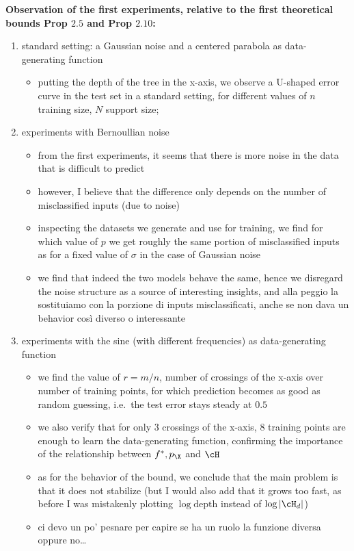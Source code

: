 {\bf Observation of the first experiments, relative to the first theoretical bounds Prop $2.5$ and Prop $2.10$:}

\begin{enumerate}
    \item standard setting: a Gaussian noise and a centered parabola as data-generating function
\begin{itemize}
    \item putting the depth of the tree in the x-axis, we observe a U-shaped error curve in the test set in a standard setting, for different values of $n$ training size, $N$ support size;
\end{itemize}
    \item experiments with Bernoullian noise
    \begin{itemize}
        \item from the first experiments, it seems that there is more noise in the data that is difficult to predict 
        \item however, I believe that the difference only depends on the number of misclassified inputs (due to noise)
        \item inspecting the datasets we generate and use for training, we find for which value of $p$ we get roughly the same portion of misclassified inputs as for a fixed value of $\sigma$ in the case of Gaussian noise
        \item we find that indeed the two models behave the same, hence we disregard the noise structure as a source of interesting insights, and alla peggio la sostituiamo con la porzione di inputs misclassificati, anche se non dava un behavior così diverso o interessante
    \end{itemize}
    \item experiments with the sine (with different frequencies) as data-generating function
    \begin{itemize}
        \item we find the value of $r = m/n$, number of crossings of the x-axis over number of training points, for which prediction becomes as good as random guessing, i.e.\ the test error stays steady at $0.5$
        \item we also verify that for only $3$ crossings of the x-axis, $8$ training points are enough to learn the data-generating function, confirming the importance of the relationship between $f^*, p_\X$ and $\cH$
        \item as for the behavior of the bound, we conclude that the main problem is that it does not stabilize (but I would also add that it grows too fast, as before I was mistakenly plotting $\log \mathrm{depth}$ instead of $\log \vert \cH_d\vert$)
        \item ci devo un po' pesnare per capire se ha un ruolo la funzione diversa oppure no\dots
    \end{itemize}
\end{enumerate}

